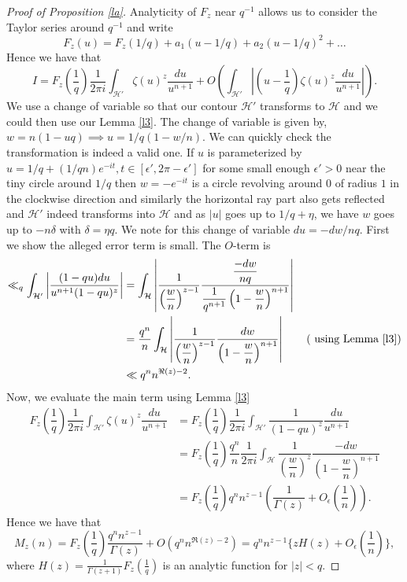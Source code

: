 \documentclass[12pt]{amsart}
\numberwithin{equation}{section}
\theoremstyle{remark}
\theoremstyle{remark}
\theoremstyle{definition}
\begin{document}
\begin{proof}[Proof of Proposition \ref{la}]
Analyticity of $F_z$ near $q^{-1}$ allows us to consider the Taylor series around $q^{-1}$ and write
$$F_z(u)=F_z\left( 1/q\right)+a_1\left(u-1/q\right)+ a_2\left(u-1/q\right)^2+\ldots$$ 
Hence we have that
$$I=F_z\left( \dfrac{1}{q}\right)\dfrac{1}{2\pi i}\displaystyle\int_{\mathcal{H}'}\zeta(u)^z\dfrac{du}{u^{n+1}}+O\left(  \displaystyle\int_{\mathcal{H}'}\left|\left( u-\dfrac{1}{q}\right)\zeta(u)^z \dfrac{du}{u^{n+1}}\right|\right).$$
We use a change of variable so that our contour $\mathcal{H}'$ transforms to $\mathcal{H}$ and we could then use our Lemma \ref{l3}. The change of variable is given by, $w=n(1-uq)\implies u=1/q\left( 1-w/n\right).$ We can quickly check the transformation is indeed a valid one. If $u$ is parameterized by $u=1/q+(1/qn)e^{-it},t\in [\epsilon',2\pi-\epsilon']$  for some small enough $\epsilon'>0$ near the tiny circle around $1/q$ then $w=-e^{-it}$ is a circle revolving around $0$ of radius $1$ in the clockwise direction and similarly the horizontal ray part also gets reflected and $\mathcal{H}'$ indeed transforms into $\mathcal{H}$ and as $|u|$ goes up to $1/q+\eta$, we have $w$ goes up to $-n\delta$ with $\delta=\eta q$. We note for this change of variable $du=-dw/nq$. First we show the alleged error term is small. The $O$-term is 
\begin{align}
\nonumber
\ll_q\displaystyle\int_{\mathcal{H}'}\left|\dfrac{(1-qu)du}{u^{n+1}(1-qu)^z} \right| &=  \displaystyle\int_{\mathcal{H}}\left|\dfrac{1}{\left(\dfrac{w}{n}\right)^{z-1}}\dfrac{\dfrac{-dw}{nq}}{\dfrac{1}{q^{n+1}}\left(1-\dfrac{w}{n} \right)^{n+1}}\right|\\
\nonumber
&=\dfrac{q^n}{n} \displaystyle\int_{\mathcal{H}}\left|\dfrac{1}{\left(\dfrac{w}{n}\right)^{z-1}}\dfrac{dw}{\left(1-\dfrac{w}{n} \right)^{n+1}}\right| \qquad  (\text{ using Lemma }\ref{l3})\\
\nonumber
&\ll q^n n^{\Re(z)-2}.
\end{align}
Now, we evaluate the main term using Lemma \ref{l3}
\begin{align}
\nonumber
F_z\left( \dfrac{1}{q}\right)\dfrac{1}{2\pi i}\displaystyle\int_{\mathcal{H}'}\zeta(u)^z\dfrac{du}{u^{n+1}} &= F_z\left( \dfrac{1}{q}\right)\dfrac{1}{2\pi i}\displaystyle\int_{\mathcal{H}'}\dfrac{1}{(1-qu)^z}\dfrac{du}{u^{n+1}}\\
\nonumber
&=F_z\left( \dfrac{1}{q}\right)\dfrac{q^n}{n}\dfrac{1}{2\pi i}\displaystyle\int_{\mathcal{H}}\dfrac{1}{\left(\dfrac{w}{n}\right)^{z}}\dfrac{-dw}{\left(1-\dfrac{w}{n} \right)^{n+1}}\\
\nonumber
&=F_z\left( \dfrac{1}{q}\right)q^n n^{z-1}\left( \dfrac{1}{\Gamma(z)}+O_{\epsilon}\left( \dfrac{1}{n}\right)\right).
\end{align}
Hence we have that 
\begin{equation}\label{lx}
M_z(n)=F_z\left( \dfrac{1}{q}\right)\dfrac{q^nn^{z-1}}{\Gamma(z)}+O\left( q^n n^{\Re(z)-2}\right)=q^nn^{z-1}\Bigg \{zH(z)+O_{\epsilon}\left(\dfrac{1}{n} \right) \Bigg \},
\end{equation}
where $H(z)=\frac{1}{\Gamma(z+1)}F_z\left( \frac{1}{q}\right)$ is an analytic function for $|z|<q.$ 
\end{proof}
\end{document}
